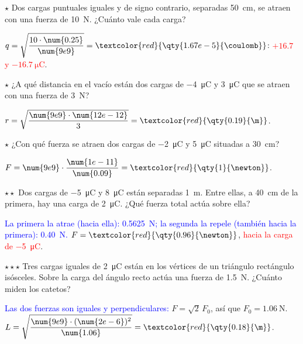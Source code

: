\begin{exercise}
    \(\star\) Dos cargas puntuales iguales y de signo contrario, separadas \qty{50}{\cm}, se atraen con una fuerza de \qty{10}{\newton}.
    ¿Cuánto vale cada carga?
    \begin{solu}
        \(q = \sqrt{\dfrac{10 \cdot \num{0.25}}{\num{9e9}}} = \textcolor{red}{\qty{1.67e-5}{\coulomb}}\): \textcolor{red}{\(+\num{16.7}\)
        y \(-\qty{16.7}{\micro\coulomb}\)}.
    \end{solu}
\end{exercise}

\begin{exercise}
    \(\star\) ¿A qué distancia en el vacío están dos cargas de \qty{-4}{\micro\coulomb} y \qty{+3}{\micro\coulomb} que se atraen con
    una fuerza de \qty{3}{\newton}?
    \begin{solu}
        \(r = \sqrt{\dfrac{\num{9e9} \cdot \num{12e-12}}{3}} = \textcolor{red}{\qty{0.19}{\m}}\).
    \end{solu}
\end{exercise}

\begin{exercise}
    \(\star\) ¿Con qué fuerza se atraen dos cargas de \qty{-2}{\micro\coulomb} y \qty{+5}{\micro\coulomb} situadas a \qty{30}{\cm}?
    \begin{solu}
        \(F = \num{9e9} \cdot \dfrac{\num{1e-11}}{\num{0.09}} = \textcolor{red}{\qty{1}{\newton}}\).
    \end{solu}
\end{exercise}

\begin{exercise}
    \(\star\star\) Dos cargas de \qty{-5}{\micro\coulomb} y \qty{+8}{\micro\coulomb} están separadas \qty{1}{\m}. Entre ellas, a
    \qty{40}{\cm} de la primera, hay una carga de \qty{+2}{\micro\coulomb}. ¿Qué fuerza total actúa sobre ella?
    \begin{solu}
        \textcolor{blue}{La primera la atrae (hacia ella): \qty{0.5625}{\newton}; la segunda la repele (también hacia la primera):
        \qty{0.40}{\newton}.} \(F = \textcolor{red}{\qty{0.96}{\newton}}\), \textcolor{red}{hacia la carga de \qty{-5}{\micro\coulomb}}.
    \end{solu}
\end{exercise}

\begin{exercise}
    \(\star\star\star\) Tres cargas iguales de \qty{+2}{\micro\coulomb} están en los vértices de un triángulo rectángulo isósceles. Sobre
    la carga del ángulo recto actúa una fuerza de \qty{1.5}{\newton}. ¿Cuánto miden los catetos?
    \begin{solu}
        \textcolor{blue}{Las dos fuerzas son iguales y perpendiculares:} \(F = \sqrt{2}\,F_0\), así que \(F_0 = \qty{1.06}{\newton}\).
        \(L = \sqrt{\dfrac{\num{9e9} \cdot (\num{2e-6})^2}{\num{1.06}}} = \textcolor{red}{\qty{0.18}{\m}}\).
    \end{solu}
\end{exercise}

